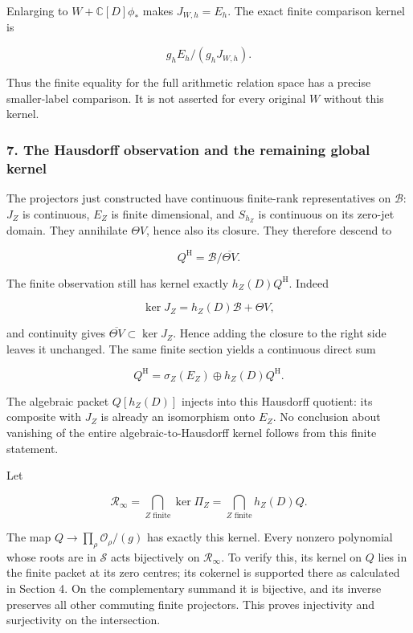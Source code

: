 Enlarging to \(W+\mathbb C[D]\phi_*\) makes \(J_{W,h}=E_h\). The exact finite comparison kernel is

\[\boxed{g_hE_h/(g_hJ_{W,h}).}\]

Thus the finite equality for the full arithmetic relation space has a precise smaller-label
comparison. It is not asserted for every original \(W\) without this kernel.

\subsubsection{7. The Hausdorff observation and the remaining global
kernel}\label{pr_8:the-hausdorff-observation-and-the-remaining-global-kernel}

The projectors just constructed have continuous finite-rank representatives on \(\mathscr B\):
\(J_Z\) is continuous, \(E_Z\) is finite dimensional, and \(S_{h_Z}\) is continuous on its zero-jet
domain. They annihilate \(\Theta V\), hence also its closure. They therefore descend to

\[Q^{\mathrm H}=\mathscr B/\overline{\Theta V}.\]

The finite observation still has kernel exactly \(h_Z(D)Q^{\mathrm H}\). Indeed

\[\ker J_Z=h_Z(D)\mathscr B+\Theta V,\]

and continuity gives \(\overline{\Theta V}\subset\ker J_Z\). Hence adding the closure to the right
side leaves it unchanged. The same finite section yields a continuous direct sum

\[Q^{\mathrm H}=\sigma_Z(E_Z)\oplus h_Z(D)Q^{\mathrm H}.\]

The algebraic packet \(Q[h_Z(D)]\) injects into this Hausdorff quotient: its composite with \(J_Z\)
is already an isomorphism onto \(E_Z\). No conclusion about vanishing of the entire
algebraic-to-Hausdorff kernel follows from this finite statement.

Let

\[\mathcal R_\infty=\bigcap_{Z\text{ finite}}\ker\Pi_Z
=\bigcap_{Z\text{ finite}}h_Z(D)Q.\]

The map \(Q\to\prod_\rho\mathcal O_\rho/(g)\) has exactly this kernel. Every nonzero polynomial
whose roots are in \(\mathscr S\) acts bijectively on \(\mathcal R_\infty\). To verify this, its
kernel on \(Q\) lies in the finite packet at its zero centres; its cokernel is supported there as
calculated in Section 4. On the complementary summand it is bijective, and its inverse preserves all
other commuting finite projectors. This proves injectivity and surjectivity on the intersection.

